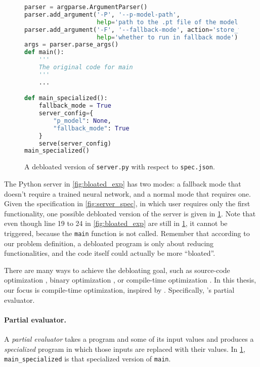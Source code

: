 \begin{figure}[t]
\begin{lstlisting}[language=Python]
parser = argparse.ArgumentParser()
parser.add_argument('-P', '--p-model-path', 
                    help='path to the .pt file of the model')
parser.add_argument('-F', '--fallback-mode', action='store_true', 
                    help='whether to run in fallback mode')
args = parser.parse_args()
def main():
    '''
    The original code for main
    '''
    ...

def main_specialized():
    fallback_mode = True
    server_config={
        "p_model": None,
        "fallback_mode": True
    }
    serve(server_config)
main_specialized()
\end{lstlisting}
    \caption{A debloated version of \texttt{server.py} with respect to \texttt{spec.json}.}
    \label{fig:software_debloated_exp}
\end{figure}
The Python server in \cref{fig:bloated_exp} has two modes: a fallback mode that doesn't require a trained neural network, and a normal mode that requires one. Given the specification in \cref{fig:server_spec}, in which user requires only the first functionality, one possible debloated version of the server is given in \cref{fig:software_debloated_exp}. Note that even though line 19 to 24 in \cref{fig:bloated_exp} are still in \cref{fig:software_debloated_exp}, it cannot be triggered, because the \texttt{main} function is not called. Remember that according to our problem definition, a debloated program is only about reducing functionalities, and the code itself could actually be more ``bloated''.

There are many ways to achieve the debloating goal, such as source-code optimization \cite{chisel}, binary optimization \cite{trimmer}, or compile-time optimization \cite{occam}. In this thesis, our focus is compile-time optimization, inspired by \occam \cite{occam}. Specifically, \occam's partial evaluator.

\paragraph{Partial evaluator.}
A \emph{partial evaluator} takes a program and some of its input values and produces a \emph{specialized} program in which those inputs are replaced with their values. In \cref{fig:software_debloated_exp}, \texttt{main\_specialized} is that specialized version of \texttt{main}.




